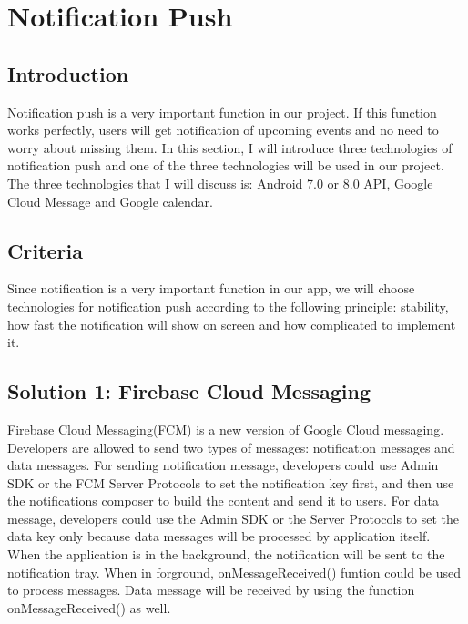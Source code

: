\documentclass[letterpaper, 10pt,titlepage]{article}
\begin{document}
\section{Notification Push}

\subsection{Introduction}
Notification push is a very important function in our project. If this function works perfectly, users will get notification of upcoming events and no need to worry about missing them. In this section, I will introduce three technologies of notification push and one of the three technologies will be used in our project. The three technologies that I will discuss is: Android 7.0 or 8.0 API, Google Cloud Message and Google calendar.\\

\subsection{Criteria}
Since notification is a very important function in our app, we will choose technologies for notification push according to the following principle: stability, how fast the notification will show on screen and how complicated to implement it.\\

\subsection{Solution 1: Firebase Cloud Messaging}
Firebase Cloud Messaging(FCM) is a new version of Google Cloud messaging. Developers are allowed to send two types of messages: notification messages and data messages. For sending notification message, developers could use Admin SDK or the FCM Server Protocols to set the notification key first, and then use the notifications composer to build the content and send it to users. For data message, developers could use the Admin SDK or the Server Protocols to set the data key only because data messages will be processed by application itself. When the application is in the background, the notification will be sent to the notification tray. When in forground, onMessageReceived() funtion could be used to process messages. Data message will be received by using the function onMessageReceived() as well.  \cite{firebasecloudmessage}\\
\end{document}
